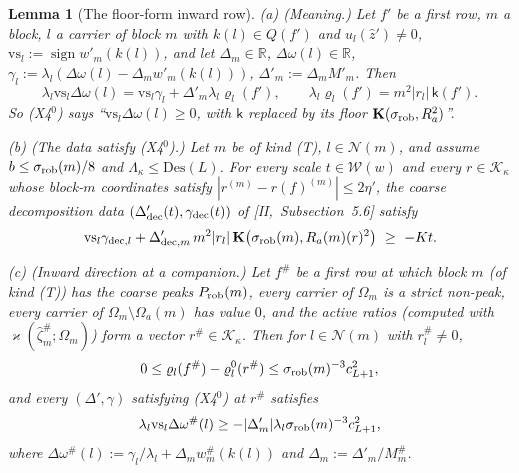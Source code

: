 \documentclass[10pt]{amsart}
\newtheorem{lemma}[theorem]{Lemma}
\theoremstyle{definition}
\theoremstyle{remark}
\newcommand{\sgn}{\operatorname{sign}}
\newcommand{\R}{\mathbb R}
\newcommand{\zh}{\hat z}
\begin{document}
\begin{lemma}[The floor-form inward row]\label{lem:III-floorrow}
\textup{(a) (Meaning.)}  Let $f'$ be a first row, $m$ a block, $l$ a carrier
of block $m$ with $k(l)\in Q(f')$ and $u_l(\zh')\ne0$, $\mathrm{vs}_l:=\sgn
w'_m(k(l))$, and let $\Delta_m\in\R$, $\Delta\omega(l)\in\R$, $\gamma_l:=
\lambda_l(\Delta\omega(l)-\Delta_mw'_m(k(l)))$, $\Delta'_m:=\Delta_mM'_m$.  Then
\[
 \lambda_l\mathrm{vs}_l\Delta\omega(l)=\mathrm{vs}_l\gamma_l+\Delta'_m\lambda_l
 \varrho_l(f'),\qquad\lambda_l\varrho_l(f')=m^2|r_l|\,\mathsf k(f').
\]
So \textup{(X4$^0$)} says ``$\mathrm{vs}_l\Delta\omega(l)\ge0$, with $\mathsf k$
replaced by its floor $\mathbf K(\sigma_{\rm rob},R_a^2)$''.

\textup{(b) (The data satisfy (X4$^0$).)}  Let $m$ be of kind \textup{(T)}, $l\in
\mathcal N(m)$, and assume $b\le\sigma_{\rm rob}(m)/8$ and $\Lambda_\kappa\le
\mathrm{Des}(L)$.  For every scale $t\in\mathcal W(w)$ and every $r\in
\mathcal K_\kappa$ whose block-$m$ coordinates satisfy
$|r^{(m)}-r(f)^{(m)}|\le2\eta'$, the coarse decomposition data
$(\Delta'_{\rm dec}(t),\gamma_{\rm dec}(t))$ of [II,~Subsection~5.6] satisfy
\[
 \mathrm{vs}_l\gamma_{{\rm dec},l}+\Delta'_{{\rm dec},m}\,m^2|r_l|\,\mathbf K
 \big(\sigma_{\rm rob}(m),R_a(m)(r)^2\big)\ \ge\ -Kt .
\]

\textup{(c) (Inward direction at a companion.)}  Let $f^\#$ be a first row at
which block $m$ \textup{(}of kind \textup{(T))} has the coarse peaks
$P_{\rm rob}(m)$, every carrier of $\Omega_m$ is a strict non-peak, every
carrier of $\Omega_m\setminus\Omega_a(m)$ has value $0$, and the active ratios
\textup{(}computed with $\varkappa(\hat\zeta^\#_m;\Omega_m)$\textup{)} form a vector
$r^\#\in\mathcal K_\kappa$.  Then for $l\in\mathcal N(m)$ with $r^\#_l\ne0$,
\[
 0\le\varrho_l(f^\#)-\varrho^0_l(r^\#)\le\sigma_{\rm rob}(m)^{-3}c_{L+1}^2,
\]
and every $(\Delta',\gamma)$ satisfying \textup{(X4$^0$)} at $r^\#$ satisfies
\[
 \lambda_l\mathrm{vs}_l\Delta\omega^\#(l)\ge-|\Delta'_m|\lambda_l\sigma_{\rm rob}
 (m)^{-3}c_{L+1}^2,
\]
where $\Delta\omega^\#(l):=\gamma_l/\lambda_l+\Delta_mw^\#_m(k(l))$ and
$\Delta_m:=\Delta'_m/M^\#_m$.
\end{lemma}
\end{document}
